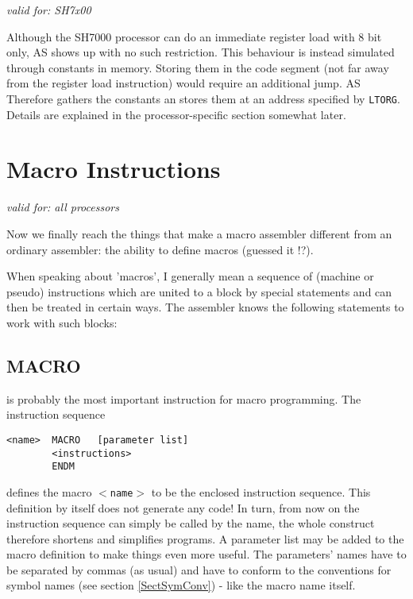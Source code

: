 \documentclass[12pt,twoside]{report}
\makeatletter
\newcommand{\tty}[1]{{\tt #1}}
\newcommand{\ttindex}[1]{\index{#1@{\tt #1}}}
\makeatother
\begin{document}
{\em valid for: SH7x00}

Although the SH7000 processor can do an immediate register load with
8 bit only, AS shows up with no such restriction.  This behaviour is
instead simulated through constants in memory.  Storing them in
the code segment (not far away from the register load instruction)
would require an additional jump.  AS Therefore gathers the constants
an stores them at an address specified by \tty{LTORG}.  Details are
explained in the processor-specific section somewhat later.


\section{Macro Instructions}

{\em valid for: all processors}

Now we finally reach the things that make a macro assembler different
from an ordinary assembler: the ability to define macros (guessed
it !?).

When speaking about 'macros', I generally mean a sequence of (machine
or pseudo) instructions which are united to a block by special
statements and can then be treated in certain ways.  The assembler
knows the following statements to work with such blocks:


\subsection{MACRO}
\ttindex{MACRO}\ttindex{ENDM}
\label{SectMacros}

is probably the most important instruction for macro programming.
The instruction sequence
\begin{verbatim}
<name>  MACRO   [parameter list]
        <instructions>
        ENDM
\end{verbatim}
defines the macro \tty{$<$name$>$} to be the enclosed instruction sequence.
This definition by itself does not generate any code!  In turn, from
now on the instruction sequence can simply be called by the name, the
whole construct therefore shortens and simplifies programs.  A
parameter list may be added to the macro definition to make things
even more useful.  The parameters' names have to be separated by
commas (as usual) and have to conform to the conventions for symbol
names (see section \ref{SectSymConv}) - like the macro name itself.
\end{document}
